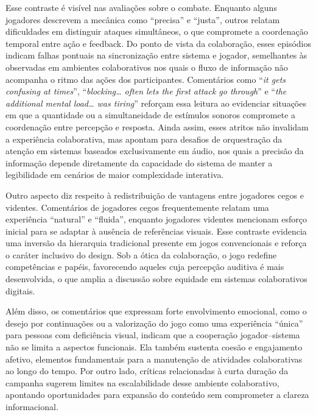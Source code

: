 \documentclass[12pt]{article}
\begin{document}
{{Esse contraste é visível nas avaliações sobre o combate. Enquanto alguns jogadores descrevem a mecânica como “precisa” e “justa”, outros relatam dificuldades em distinguir ataques simultâneos, o que compromete a coordenação temporal entre ação e feedback. Do ponto de vista da colaboração, esses episódios indicam falhas pontuais na sincronização entre sistema e jogador, semelhantes às observadas em ambientes colaborativos nos quais o fluxo de informação não acompanha o ritmo das ações dos participantes. Comentários como “\textit{it gets confusing at times}”, “\textit{blocking… often lets the first attack go through}” e “\textit{the additional mental load… was tiring}” reforçam essa leitura ao evidenciar situações em que a quantidade ou a simultaneidade de estímulos sonoros compromete a coordenação entre percepção e resposta. Ainda assim, esses atritos não invalidam a experiência colaborativa, mas apontam para desafios de orquestração da atenção em sistemas baseados exclusivamente em áudio, nos quais a precisão da informação depende diretamente da capacidade do sistema de manter a legibilidade em cenários de maior complexidade interativa.

Outro aspecto diz respeito à redistribuição de vantagens entre jogadores cegos e videntes. Comentários de jogadores cegos frequentemente relatam uma experiência “natural” e “fluida”, enquanto jogadores videntes mencionam esforço inicial para se adaptar à ausência de referências visuais. Esse contraste evidencia uma inversão da hierarquia tradicional presente em jogos convencionais e reforça o caráter inclusivo do design. Sob a ótica da colaboração, o jogo redefine competências e papéis, favorecendo aqueles cuja percepção auditiva é mais desenvolvida, o que amplia a discussão sobre equidade em sistemas colaborativos digitais.

Além disso, os comentários que expressam forte envolvimento emocional, como o desejo por continuações ou a valorização do jogo como uma experiência “única” para pessoas com deficiência visual, indicam que a cooperação jogador–sistema não se limita a aspectos funcionais. Ela também sustenta coesão e engajamento afetivo, elementos fundamentais para a manutenção de atividades colaborativas ao longo do tempo. Por outro lado, críticas relacionadas à curta duração da campanha sugerem limites na escalabilidade desse ambiente colaborativo, apontando oportunidades para expansão do conteúdo sem comprometer a clareza informacional.

}}
\end{document}
